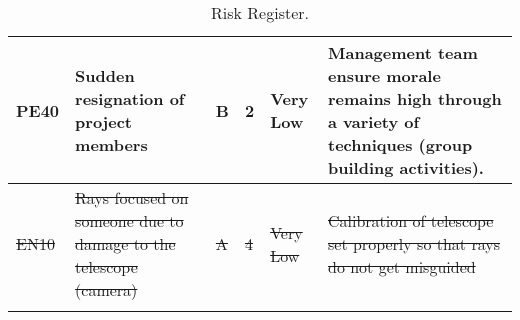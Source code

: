 \begin{longtable}{|m{}| m{} |m{} |m{}|m{}| m{}|}
PE40 & Sudden resignation of project members								& B & 2 & \cellcolor[HTML]{34FF34}Very Low	& Management team ensure morale remains high through a variety of techniques (group building activities).\\\hline


\st{EN10} & \st{Rays focused on someone due to damage to the telescope (camera)} & \st{A} & \st{4} &  \cellcolor[HTML]{34FF34}\st{Very Low} & \st{Calibration of telescope set properly so that rays do not get misguided} \\\hline


\caption{Risk Register.}
\label{tab:risk-register}
\end{longtable}
\raggedbottom